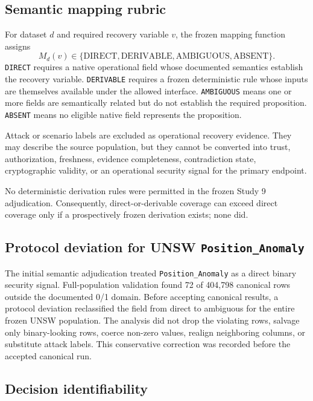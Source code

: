 \documentclass[preprint,12pt]{elsarticle}
\begin{document}
\subsection{Semantic mapping rubric}

For dataset $d$ and required recovery variable $v$, the frozen mapping function assigns
\[
M_d(v) \in \{\mathrm{DIRECT},\mathrm{DERIVABLE},\mathrm{AMBIGUOUS},\mathrm{ABSENT}\}.
\]
\texttt{DIRECT} requires a native operational field whose documented semantics establish the recovery variable. \texttt{DERIVABLE} requires a frozen deterministic rule whose inputs are themselves available under the allowed interface. \texttt{AMBIGUOUS} means one or more fields are semantically related but do not establish the required proposition. \texttt{ABSENT} means no eligible native field represents the proposition.

Attack or scenario labels are excluded as operational recovery evidence. They may describe the source population, but they cannot be converted into trust, authorization, freshness, evidence completeness, contradiction state, cryptographic validity, or an operational security signal for the primary endpoint.

No deterministic derivation rules were permitted in the frozen Study 9 adjudication. Consequently, direct-or-derivable coverage can exceed direct coverage only if a prospectively frozen derivation exists; none did.

\subsection{Protocol deviation for UNSW \texttt{Position\_Anomaly}}

The initial semantic adjudication treated \texttt{Position\_Anomaly} as a direct binary security signal. Full-population validation found 72 of 404,798 canonical rows outside the documented 0/1 domain. Before accepting canonical results, a protocol deviation reclassified the field from direct to ambiguous for the entire frozen UNSW population. The analysis did not drop the violating rows, salvage only binary-looking rows, coerce non-zero values, realign neighboring columns, or substitute attack labels. This conservative correction was recorded before the accepted canonical run.

\subsection{Decision identifiability}
\end{document}
